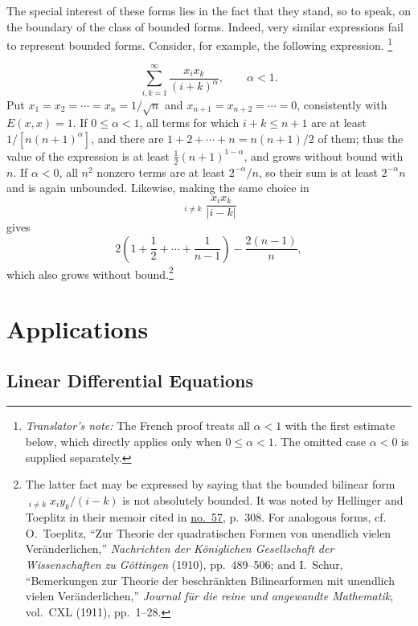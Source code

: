 \documentclass[
  paper=b5,
  fontsize=13pt,
  twoside=true,
  open=any,
  bookmarkpackage=false,
  chapterprefix=true,
  headings=normal
]{scrbook}
\theoremstyle{definition}
\newcounter{translatornote}
\newcommand{\translatornotelabel}{T\arabic{translatornote}}
\newcommand{\translatornote}[1]{%
  \stepcounter{translatornote}%
  \begingroup
    \edef\savedfootnotenumber{\number\value{footnote}}%
    \renewcommand{\thefootnote}{\translatornotelabel}%
    \footnote{\emph{Translator's note:} #1}%
    \setcounter{footnote}{\savedfootnotenumber}%
  \endgroup
}
\begin{document}
The special interest of these forms lies in the fact that they stand, so to
speak, on the boundary of the class of bounded forms.  Indeed, very similar
expressions fail to represent bounded forms.  Consider, for example, the
following expression.\translatornote{The French proof treats all \(\alpha<1\)
with the first estimate below, which directly applies only when
\(0\le\alpha<1\).  The omitted case \(\alpha<0\) is supplied separately.}
\[
  \sum_{i,k=1}^{\infty}\frac{x_ix_k}{(i+k)^\alpha},
  \qquad \alpha<1.
\]
Put \(x_1=x_2=\cdots=x_n=1/\sqrt n\) and
\(x_{n+1}=x_{n+2}=\cdots=0\), consistently with \(E(x,x)=1\).  If
\(0\le\alpha<1\), all terms for which \(i+k\le n+1\) are at least
\(1/[n(n+1)^\alpha]\), and there are
\(1+2+\cdots+n=n(n+1)/2\) of them; thus the value of the expression is at least
\(\tfrac12(n+1)^{1-\alpha}\), and grows without bound with \(n\).  If
\(\alpha<0\), all \(n^2\) nonzero terms are at least \(2^{-\alpha}/n\), so
their sum is at least \(2^{-\alpha}n\) and is again unbounded.  Likewise,
making the same choice in
\[
  \mathop{\sum_{i,k=1}^{\infty}}_{i\ne k}\frac{x_ix_k}{|i-k|}
\]
gives
\[
  2\left(1+\frac12+\cdots+\frac1{n-1}\right)-\frac{2(n-1)}n,
\]
which also grows without bound.\footnote{The latter fact may be expressed by
saying that the bounded bilinear form
\(\mathop{\sum_{i,k=1}^{\infty}}_{i\ne k}x_iy_k/(i-k)\) is not absolutely
bounded.  It was noted by Hellinger and Toeplitz in their memoir cited in
\hyperref[sec:57]{no.~57}, p.~308.  For analogous forms, cf. O.~Toeplitz,
``Zur Theorie der quadratischen Formen von unendlich vielen Veränderlichen,''
\emph{Nachrichten der Königlichen Gesellschaft der Wissenschaften zu
Göttingen} (1910), pp.~489--506; and I.~Schur, ``Bemerkungen zur Theorie der
beschränkten Bilinearformen mit unendlich vielen Veränderlichen,''
\emph{Journal für die reine und angewandte Mathematik}, vol.~CXL (1911),
pp.~1--28.}

\chapter{Applications}\label{chap:6}

\section{Linear Differential Equations}
\end{document}
